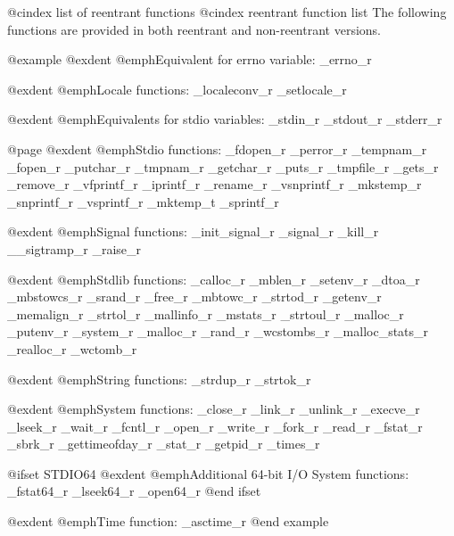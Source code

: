 @cindex list of reentrant functions
@cindex reentrant function list
The following functions are provided in both reentrant
and non-reentrant versions.

@example
@exdent @emph{Equivalent for errno variable:}
_errno_r

@exdent @emph{Locale functions:}
_localeconv_r  _setlocale_r

@exdent @emph{Equivalents for stdio variables:}
_stdin_r        _stdout_r       _stderr_r

@page
@exdent @emph{Stdio functions:}
_fdopen_r       _perror_r       _tempnam_r
_fopen_r        _putchar_r      _tmpnam_r
_getchar_r      _puts_r         _tmpfile_r
_gets_r         _remove_r       _vfprintf_r
_iprintf_r      _rename_r       _vsnprintf_r
_mkstemp_r      _snprintf_r     _vsprintf_r
_mktemp_t       _sprintf_r

@exdent @emph{Signal functions:}
_init_signal_r  _signal_r
_kill_r         __sigtramp_r
_raise_r

@exdent @emph{Stdlib functions:}
_calloc_r       _mblen_r        _setenv_r
_dtoa_r         _mbstowcs_r     _srand_r
_free_r         _mbtowc_r       _strtod_r
_getenv_r       _memalign_r     _strtol_r
_mallinfo_r     _mstats_r       _strtoul_r
_malloc_r       _putenv_r       _system_r
_malloc_r       _rand_r         _wcstombs_r
_malloc_stats_r _realloc_r      _wctomb_r

@exdent @emph{String functions:}
_strdup_r       _strtok_r

@exdent @emph{System functions:}
_close_r        _link_r         _unlink_r
_execve_r       _lseek_r        _wait_r
_fcntl_r        _open_r         _write_r
_fork_r         _read_r
_fstat_r        _sbrk_r
_gettimeofday_r _stat_r
_getpid_r       _times_r

@ifset STDIO64
@exdent @emph{Additional 64-bit I/O System functions:}
_fstat64_r	_lseek64_r	_open64_r
@end ifset

@exdent @emph{Time function:}
_asctime_r
@end example
